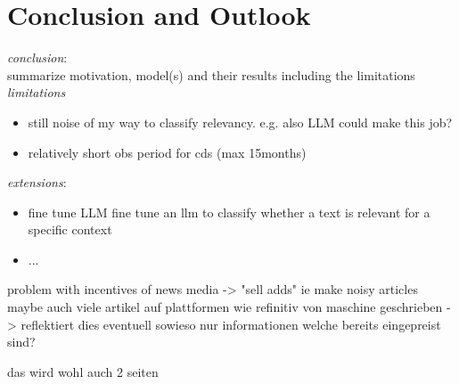\chapter{Conclusion and Outlook}\label{sec6}
\thispagestyle{empty}

\textit{conclusion}: \\
summarize motivation, model(s) and their results including the limitations \\

\noindent
\textit{limitations}
\begin{itemize}
	\item still noise of my way to classify relevancy. e.g. also LLM could make this job?
	\item relatively short obs period for cds (max 15months)
\end{itemize}

\noindent
\textit{extensions}:
\begin{itemize}
	\item fine tune LLM fine tune an llm to classify whether a text is relevant for a specific context
	\item ...
\end{itemize}

problem with incentives of news media -> "sell adds" ie make noisy articles \\

maybe auch viele artikel auf plattformen wie refinitiv von maschine geschrieben -> reflektiert dies eventuell sowieso nur informationen welche bereits eingepreist sind?

\newpage

das wird wohl auch 2 seiten




\cleardoublepage
